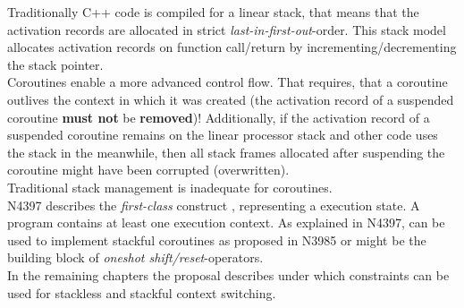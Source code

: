 Traditionally C++ code is compiled for a linear stack, that means that the
activation records are allocated in strict \emph{last-in-first-out}-order. This
stack model allocates activation records on function call/return by
incrementing/decrementing the stack pointer.\\
Coroutines enable a more advanced control flow. That requires, that a coroutine
outlives the context in which it was created (the activation record of a
suspended coroutine {\bfseries must not} be {\bfseries removed})! Additionally,
if the activation record of a suspended coroutine remains on the linear
processor stack and other code uses the stack in the meanwhile, then all stack
frames allocated after suspending the coroutine might have been corrupted
(overwritten).\\
Traditional stack management is inadequate for coroutines.\\
\newline
N4397\cite{N4397} describes the \emph{first-class} construct \ectx, representing
a execution state. A program contains at least one execution context. As
explained in N4397, \ectx can be used to implement stackful coroutines as
proposed in N3985\cite{N3985} or might be the building block of \emph{oneshot
shift/reset}-operators.\\
In the remaining chapters the proposal describes under which constraints \ectx
can be used for stackless and stackful context switching.

